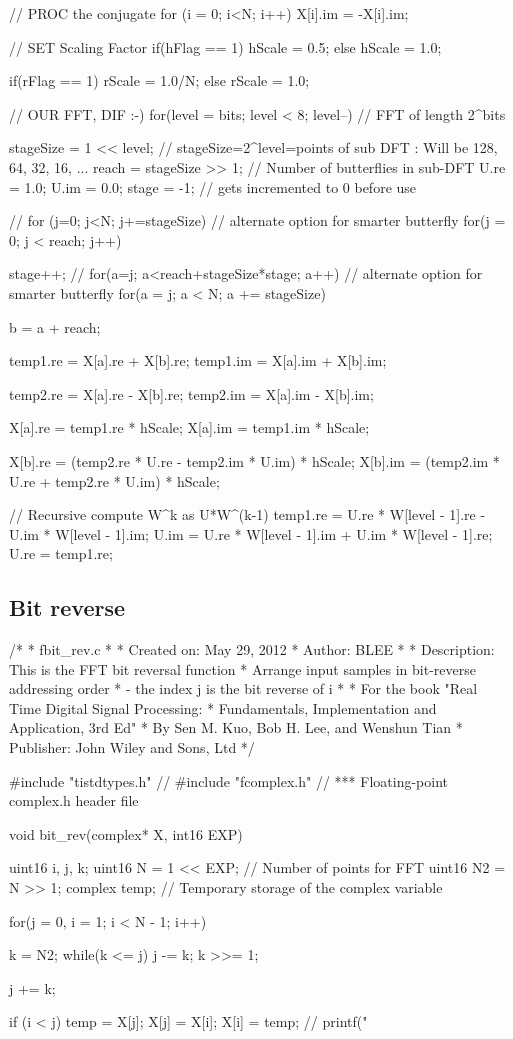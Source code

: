\documentclass{bannerReport}
\begin{document}
\begin{code}
{	// PROC the conjugate
	for (i = 0;	 i<N; i++)
	{
		X[i].im = -X[i].im;
	}

	// SET Scaling Factor
	if(hFlag == 1)
	{
		hScale = 0.5;
	}
	else   
	{
		hScale = 1.0; 
	}


	if(rFlag == 1)
	{
		rScale = 1.0/N;
	}
	else   
	{
		rScale = 1.0; 
	}           
	
	// OUR FFT, DIF :-)
	for(level = bits; level < 8; level--) 	// FFT of length 2^bits 
	{
		stageSize = 1 << level;        	// stageSize=2^level=points of sub 
		DFT
		: Will be 128, 64, 32, 16, ... 
		reach = stageSize >> 1;      	// Number of butterflies in sub-DFT 
		U.re  = 1.0;
		U.im  = 0.0;
		stage = -1;					// gets incremented to 0 before use

		// for (j=0; j<N; j+=stageSize)		// alternate option for smarter 
		butterfly
		for(j = 0; j < reach; j++)
		{
			stage++;
			// for(a=j; a<reach+stageSize*stage; a++) // alternate option for
			smarter butterfly
			for(a = j; a < N; a += stageSize)
			{
				b = a + reach;

				temp1.re = X[a].re + X[b].re;
				temp1.im = X[a].im + X[b].im;

				temp2.re = X[a].re - X[b].re;
				temp2.im = X[a].im - X[b].im;

				X[a].re = temp1.re * hScale;
				X[a].im = temp1.im * hScale;

				X[b].re = (temp2.re * U.re - temp2.im * U.im) * hScale;
				X[b].im = (temp2.im * U.re + temp2.re * U.im) * hScale;
			}
			
			// Recursive compute W^k as U*W^(k-1) 
			temp1.re = U.re * W[level - 1].re - U.im * W[level - 1].im;
			U.im	 = U.re * W[level - 1].im + U.im * W[level - 1].re;
			U.re	 = temp1.re;
		}
	}
}
\end{code}
\subsection{Bit reverse}
\begin{code}
/*
* fbit_rev.c
*
*  Created on: May 29, 2012
*      Author: BLEE
*
*  Description: This is the FFT bit reversal function
*               Arrange input samples in bit-reverse addressing order
*               - the index j is the bit reverse of i
*
*  For the book "Real Time Digital Signal Processing:
*                Fundamentals, Implementation and Application, 3rd Ed"
*                By Sen M. Kuo, Bob H. Lee, and Wenshun Tian
*                Publisher: John Wiley and Sons, Ltd
*/

#include "tistdtypes.h"
// #include "fcomplex.h"	// *** Floating-point complex.h header file 

void bit_rev(complex* X, int16 EXP)
{
	uint16 i, j, k;
	uint16 N = 1 << EXP;	// Number of points for FFT 
	uint16 N2 = N >> 1;
	complex temp;		// Temporary storage of the complex variable 
	
	for(j = 0, i = 1; i < N - 1; i++)
	{
		k = N2;
		while(k <= j)
		{
				j -= k;
			k >>= 1;
		}
		
		j += k;

		if (i < j)
		{
			temp = X[j];
			X[j] = X[i];
			X[i] = temp;
		}
		// printf("%
	}  
}
		   
		\end{code}
\end{document}
